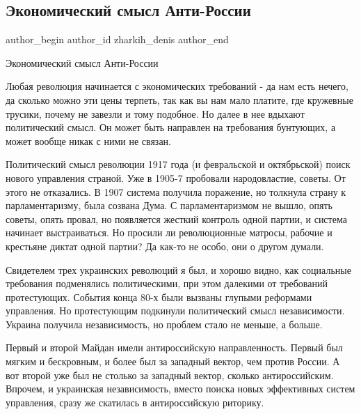  
 
 
 
 
 
\subsection{Экономический смысл Анти-России}
\label{sec:06_01_2022.fb.zharkih_denis.1.ekonomicheskij_smysl_anti_rossii}
 
\ifcmt
 author_begin
   author_id zharkih_denis
 author_end
\fi

Экономический смысл Анти-России

Любая революция начинается с экономических требований - да нам есть нечего, да
сколько можно эти цены терпеть, так как вы нам мало платите, где кружевные
трусики, почему не завезли и тому подобное. Но далее в нее вдыхают политический
смысл. Он может быть направлен на требования бунтующих, а может вообще никак с
ними не связан. 

Политический смысл революции 1917 года (и февральской и октябрьской) поиск
нового управления страной. Уже в 1905-7 пробовали народовластие, советы. От
этого не отказались. В 1907 система получила поражение, но толкнула страну к
парламентаризму, была созвана Дума. С парламентаризмом не вышло, опять советы,
опять провал, но появляется жесткий контроль одной партии, и система начинает
выстраиваться.  Но просили ли революционные матросы, рабочие и крестьяне диктат
одной партии? Да как-то не особо, они о другом думали. 

Свидетелем трех украинских революций я был, и хорошо видно, как социальные
требования подменялись политическими, при этом далекими от требований
протестующих. События конца 80-х  были вызваны глупыми реформами управления. Но
протестующим подкинули политический смысл независимости. Украина получила
независимость, но проблем стало не меньше, а больше.

Первый и второй Майдан имели антироссийскую направленность. Первый был мягким и
бескровным, и более был за западный вектор, чем против России. А вот второй уже
был не столько за западный вектор, сколько антироссийским. Впрочем, и
украинская независимость, вместо поиска новых эффективных систем управления,
сразу же скатилась в антироссийскую риторику.  

